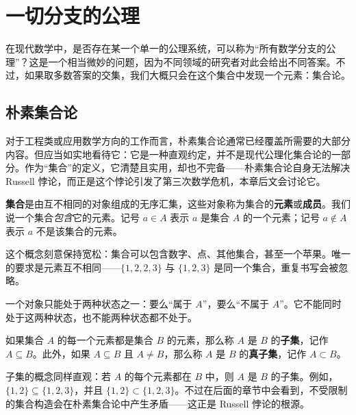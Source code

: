 \chapter{一切分支的公理}
\renewcommand{\thesection}{\arabic{chapter}.\arabic{section}}

在现代数学中，是否存在某一个单一的公理系统，可以称为“所有数学分支的公理”？这是一个相当微妙的问题，因为不同领域的研究者对此会给出不同答案。不过，如果取多数答案的交集，我们大概只会在这个集合中发现一个元素：集合论。

\section{朴素集合论}

对于工程类或应用数学方向的工作而言，朴素集合论通常已经覆盖所需要的大部分内容。但应当如实地看待它：它是一种直观约定，并不是现代公理化集合论的一部分。作为“集合”的定义，它清楚且实用，却也不完备——朴素集合论自身无法解决 Russell 悖论，而正是这个悖论引发了第三次数学危机，本章后文会讨论它。

\begin{definition}[集合]
\textbf{集合}是由互不相同的对象组成的无序汇集，这些对象称为集合的\textbf{元素}或\textbf{成员}。我们说一个集合\emph{包含}它的元素。记号 $a \in A$ 表示 $a$ 是集合 $A$ 的一个元素；记号 $a \notin A$ 表示 $a$ 不是该集合的元素。
\end{definition}

这个概念刻意保持宽松：集合可以包含数字、点、其他集合，甚至一个苹果。唯一的要求是元素互不相同——$\{1,2,2,3\}$ 与 $\{1,2,3\}$ 是同一个集合，重复书写会被忽略。

\begin{note}
一个对象只能处于两种状态之一：要么“属于 $A$”，要么“不属于 $A$”。它不能同时处于这两种状态，也不能两种状态都不处于。
\end{note}

\begin{definition}[子集]
如果集合 $A$ 的每一个元素都是集合 $B$ 的元素，那么称 $A$ 是 $B$ 的\textbf{子集}，记作 $A \subseteq B$。此外，如果 $A \subseteq B$ 且 $A \ne B$，那么称 $A$ 是 $B$ 的\textbf{真子集}，记作 $A \subset B$。
\end{definition}

子集的概念同样直观：若 $A$ 的每个元素都在 $B$ 中，则 $A$ 是 $B$ 的子集。例如，$\{1,2\}\subseteq \{1,2,3\}$，并且 $\{1,2\}\subset \{1,2,3\}$。不过在后面的章节中会看到，不受限制的集合构造会在朴素集合论中产生矛盾——这正是 Russell 悖论的根源。

